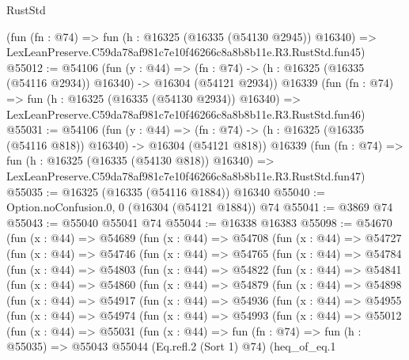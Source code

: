 \begin{lexlean}{RustStd}
\begin{coremodule}
    (fun (fn : @74) =>
    fun (h : @16325 (@16335 (@54130 @2945)) @16340) =>
    LexLeanPreserve.C59da78af981c7e10f46266c8a8b8b11e.R3.RustStd.fun45)
@55012 := @54106
    (fun (y : @44) =>
    (fn : @74) -> (h : @16325 (@16335 (@54116 @2934)) @16340) -> @16304 (@54121 @2934))
    @16339
    (fun (fn : @74) =>
    fun (h : @16325 (@16335 (@54130 @2934)) @16340) =>
    LexLeanPreserve.C59da78af981c7e10f46266c8a8b8b11e.R3.RustStd.fun46)
@55031 := @54106
    (fun (y : @44) =>
    (fn : @74) -> (h : @16325 (@16335 (@54116 @818)) @16340) -> @16304 (@54121 @818))
    @16339
    (fun (fn : @74) =>
    fun (h : @16325 (@16335 (@54130 @818)) @16340) =>
    LexLeanPreserve.C59da78af981c7e10f46266c8a8b8b11e.R3.RustStd.fun47)
@55035 := @16325 (@16335 (@54116 @1884)) @16340
@55040 := Option.noConfusion.{0, 0} (@16304 (@54121 @1884)) @74
@55041 := @3869 @74
@55043 := @55040 @55041 @74
@55044 := @16338 @16383
@55098 := @54670
    (fun (x : @44) =>
    @54689
      (fun (x : @44) =>
      @54708
        (fun (x : @44) =>
        @54727
          (fun (x : @44) =>
          @54746
            (fun (x : @44) =>
            @54765
              (fun (x : @44) =>
              @54784
                (fun (x : @44) =>
                @54803
                  (fun (x : @44) =>
                  @54822
                    (fun (x : @44) =>
                    @54841
                      (fun (x : @44) =>
                      @54860
                        (fun (x : @44) =>
                        @54879
                          (fun (x : @44) =>
                          @54898
                            (fun (x : @44) =>
                            @54917
                              (fun (x : @44) =>
                              @54936
                                (fun (x : @44) =>
                                @54955
                                  (fun (x : @44) =>
                                  @54974
                                    (fun (x : @44) =>
                                    @54993
                                      (fun (x : @44) =>
                                      @55012
                                        (fun (x : @44) =>
                                        @55031
                                          (fun (x : @44) =>
                                          fun (fn : @74) =>
                                          fun (h : @55035) =>
                                          @55043
                                            @55044
                                            (Eq.refl.{2} (Sort 1) @74)
                                            (heq_of_eq.{1}

\end{coremodule}
\end{lexlean}

